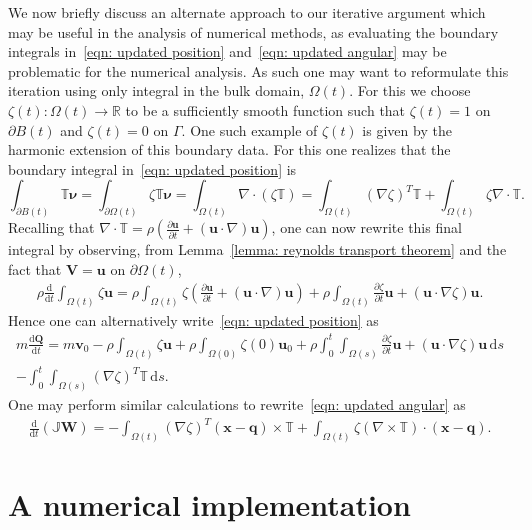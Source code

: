 \documentclass[a4paper]{amsart}
\numberwithin{equation}{section}
\newcommand{\ddt}[1]{\frac{\partial #1}{\partial t}}
\newcommand{\grad}{\nabla}
\newcommand{\Div}{\nabla \cdot}
\theoremstyle{plain}
\newcommand{\mbf}[1]{\mathbf{#1}}
\newcommand{\mbb}[1]{\mathbb{#1}}
\begin{document}
We now briefly discuss an alternate approach to our iterative argument which may be useful in the analysis of numerical methods, as evaluating the boundary integrals in~\eqref{eqn: updated position} and~\eqref{eqn: updated angular} may be problematic for the numerical analysis.
As such one may want to reformulate this iteration using only integral in the bulk domain, $\Omega(t)$.
For this we choose $\zeta(t): \Omega(t) \rightarrow \mbb{R}$ to be a sufficiently smooth function such that $\zeta(t) = 1$ on $\partial B(t)$ and $\zeta(t) = 0$ on $\Gamma$.
One such example of $\zeta(t)$ is given by the harmonic extension of this boundary data.
For this one realizes that the boundary integral in~\eqref{eqn: updated position} is
\[ \int_{\partial B(t)} \mbb{T} \boldsymbol{\nu} = \int_{\partial \Omega(t)} \zeta \mbb{T} \boldsymbol{\nu} = \int_{\Omega(t)} \Div \left( \zeta \mbb{T} \right) = \int_{\Omega(t)} (\grad \zeta)^T \mbb{T} + \int_{\Omega(t)} \zeta \Div \mbb{T} . \]
Recalling that $\Div \mbb{T} = \rho \left( \ddt{\mbf{u}} + (\mbf{u} \cdot \grad) \mbf{u}\right)$, one can now rewrite this final integral by observing, from Lemma~\ref{lemma: reynolds transport theorem} and the fact that $\mbf{V} = \mbf{u}$ on $\partial \Omega(t)$,
\begin{align*}
    \rho \frac{\mathrm{d}}{\mathrm{d}t} \int_{\Omega(t)} \zeta \mbf{u} = \rho \int_{\Omega(t)} \zeta \left( \ddt{\mbf{u}} + (\mbf{u} \cdot \grad) \mbf{u} \right)  + \rho \int_{\Omega(t)} \ddt{\zeta} \mbf{u} + (\mbf{u} \cdot \grad \zeta) \mbf{u}.
\end{align*}
Hence one can alternatively write~\eqref{eqn: updated position} as
\begin{multline*}
    m \frac{\mathrm{d} \mbf{Q}}{\mathrm{d}t} = m \mbf{v}_0 - \rho \int_{\Omega(t)} \zeta \mbf{u} + \rho \int_{\Omega(0)} \zeta(0) \mbf{u}_0 + \rho \int_0^t \int_{\Omega(s)} \ddt{\zeta} \mbf{u} + (\mbf{u} \cdot \grad \zeta) \mbf{u} \, \mathrm{d}s\\
    - \int_0^t \int_{\Omega(s)} (\grad \zeta)^T \mbb{T} \, \mathrm{d}s.
\end{multline*}
One may perform similar calculations to rewrite~\eqref{eqn: updated angular} as
\begin{align*}
    \frac{\mathrm{d}}{\mathrm{d}t} (\mbb{J} \mbf{W}) = -\int_{\Omega(t)} (\grad \zeta)^T (\mbf{x} - \mbf{q}) \times \mbb{T} + \int_{\Omega(t)} \zeta (\grad \times \mbb{T}) \cdot (\mbf{x} - \mbf{q}).
\end{align*}

\section{A numerical implementation}
\label{section: FSI numerics}
\end{document}
